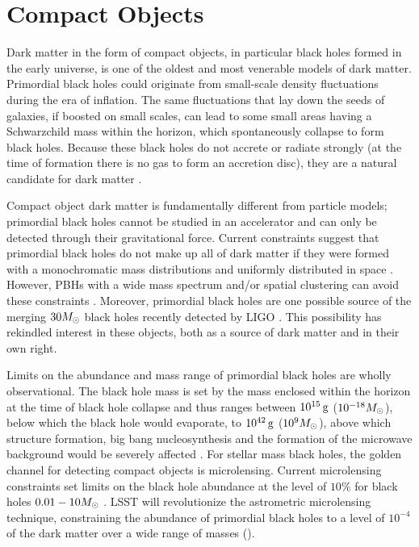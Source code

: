 \section{Compact Objects }
\label{sec:machos}

Dark matter in the form of compact objects, in particular black holes formed in the early universe, is one of the oldest and most venerable models of dark matter. Primordial black holes could originate from small-scale density fluctuations during the era of inflation. The same fluctuations that lay down the seeds of galaxies, if boosted on small scales, can lead to some small areas having a Schwarzchild mass within the horizon, which spontaneously collapse to form black holes. Because these black holes do not accrete or radiate strongly (at the time of formation there is no gas to form an accretion disc), they are a natural candidate for dark matter \citep{Carr:1974nx,1975Natur.253..251C,Carr:2016drx}. 

Compact object dark matter is fundamentally different from particle models; primordial black holes cannot be studied in an accelerator and can only be detected through their gravitational force. Current constraints suggest that primordial black holes do not make up all of dark matter if they were formed with a monochromatic mass distributions and uniformly distributed in space \citep[\eg][]{Carr:2016drx}. However, PBHs with a wide mass spectrum and/or spatial clustering can avoid these constraints \citep{Clesse:2015,1603.05234,1712.06574,Clesse:2017}. Moreover, primordial black holes are one possible source of the merging $30 M_\odot$ black holes recently detected by LIGO \citep{Bird:2016,Clesse:2016}. This possibility has rekindled interest in these objects, both as a source of dark matter and in their own right.

Limits on the abundance and mass range of primordial black holes are wholly observational. The black hole mass is set by the mass enclosed within the horizon at the time of black hole collapse and thus ranges between $10^{15}\mathrm{\,g}$ ($10^{-18} M_\odot$), below which the black hole would evaporate, to $10^{42}\mathrm{\,g}$  ($10^9 M_\odot$), above which structure formation, big bang nucleosynthesis and the formation of the microwave background would be severely affected \citep{Sasaki:2018}. 
For stellar mass black holes, the golden channel for detecting compact objects is microlensing. Current microlensing constraints set limits on the black hole abundance at the level of $10\%$ for black holes $0.01 - 10 M_\odot$ \citep[however, see][]{2018MNRAS.479.2889C}. LSST will revolutionize the astrometric microlensing technique,  constraining the abundance of primordial black holes to a level of $10^{-4}$ of the dark matter over a wide range of masses ().

